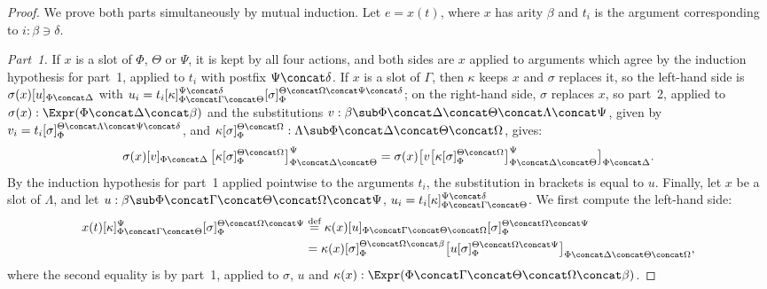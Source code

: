 \begin{proof}
    We prove both parts simultaneously by mutual induction. Let $e = x(t)$, where $x$ has arity $\beta$ and $t_i$ is the argument corresponding to $i : \beta \ni \delta$.

    \emph{Part~1.} If $x$ is a slot of $\Phi$, $\Theta$ or $\Psi$, it is kept by all four actions, and both sides are $x$ applied to arguments which agree by the induction hypothesis for part~1, applied to $t_i$ with postfix $\Psi \concat \delta$. If $x$ is a slot of $\Gamma$, then $\kappa$ keeps $x$ and $\sigma$ replaces it, so the left-hand side is $\sigma(x)[u]_{\Phi \concat \Delta}$ with $u_i = t_i[\kappa]_{\Phi \concat \Gamma \concat \Theta}^{\Psi \concat \delta}[\sigma]_\Phi^{\Theta \concat \Omega \concat \Psi \concat \delta}$; on the right-hand side, $\sigma$ replaces $x$, so part~2, applied to $\sigma(x) : \Expr(\Phi \concat \Delta \concat \beta)$ and the substitutions $v : \beta \sub \Phi \concat \Delta \concat \Theta \concat \Lambda \concat \Psi$, given by $v_i = t_i[\sigma]_\Phi^{\Theta \concat \Lambda \concat \Psi \concat \delta}$, and $\kappa[\sigma]_\Phi^{\Theta \concat \Omega} : \Lambda \sub \Phi \concat \Delta \concat \Theta \concat \Omega$, gives:
    \[
    \sigma(x)[v]_{\Phi \concat \Delta}\,\big[\kappa[\sigma]_\Phi^{\Theta \concat \Omega}\big]_{\Phi \concat \Delta \concat \Theta}^{\Psi}
    = \sigma(x)\big[v\big[\kappa[\sigma]_\Phi^{\Theta \concat \Omega}\big]_{\Phi \concat \Delta \concat \Theta}^{\Psi}\big]_{\Phi \concat \Delta}.
    \]
    By the induction hypothesis for part~1 applied pointwise to the arguments $t_i$, the substitution in brackets is equal to $u$. 
    Finally, let $x$ be a slot of $\Lambda$, and let $u : \beta \sub \Phi \concat \Gamma \concat \Theta \concat \Omega \concat \Psi$, $u_i = t_i[\kappa]_{\Phi \concat \Gamma \concat \Theta}^{\Psi \concat \delta}$. We first compute the left-hand side:
    \begin{align*}
        x(t)[\kappa]_{\Phi \concat \Gamma \concat \Theta}^{\Psi}[\sigma]_\Phi^{\Theta \concat \Omega \concat \Psi}
        &\overset{\textnormal{def}}{=} \kappa(x)[u]_{\Phi \concat \Gamma \concat \Theta \concat \Omega}[\sigma]_\Phi^{\Theta \concat \Omega \concat \Psi}\\
        &= \kappa(x)[\sigma]_\Phi^{\Theta \concat \Omega \concat \beta}\big[u[\sigma]_\Phi^{\Theta \concat \Omega \concat \Psi}\big]_{\Phi \concat \Delta \concat \Theta \concat \Omega},
    \end{align*}
    where the second equality is by part~1, applied to $\sigma$, $u$ and $\kappa(x) : \Expr(\Phi \concat \Gamma \concat \Theta \concat \Omega \concat \beta)$. 
    

\end{proof}
